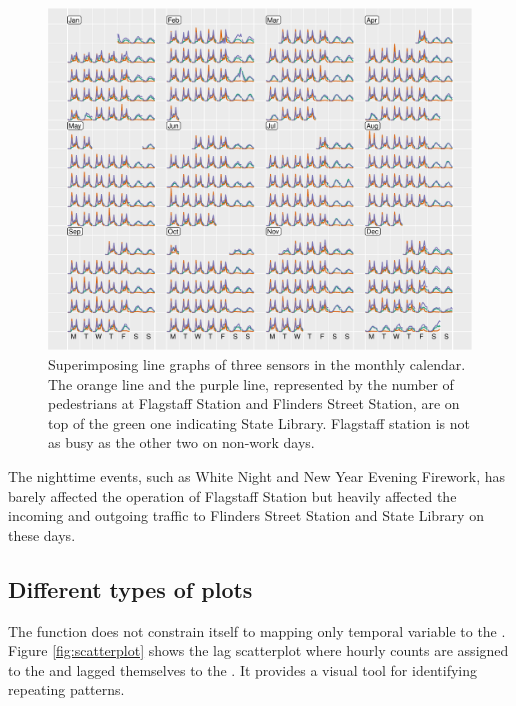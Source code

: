 \documentclass[article]{jss}
\begin{document}
\begin{CodeChunk}
\begin{figure}

{\centering \includegraphics[width=\textwidth]{figure/overlay-1} 

}

\caption[Superimposing line graphs of three sensors in the monthly calendar]{Superimposing line graphs of three sensors in the monthly calendar. The orange line and the purple line, represented by the number of pedestrians at Flagstaff Station and Flinders Street Station, are on top of the green one indicating State Library. Flagstaff station is not as busy as the other two on non-work days.}\label{fig:overlay}
\end{figure}
\end{CodeChunk}

The nighttime events, such as White Night and New Year Evening Firework,
has barely affected the operation of Flagstaff Station but heavily
affected the incoming and outgoing traffic to Flinders Street Station
and State Library on these days.

\subsection{Different types of plots}\label{different-types-of-plots}

The  function does not constrain itself to mapping
only temporal variable to the . Figure \ref{fig:scatterplot}
shows the lag scatterplot where hourly counts are assigned to the
 and lagged themselves to the . It provides a visual
tool for identifying repeating patterns.
\end{document}

